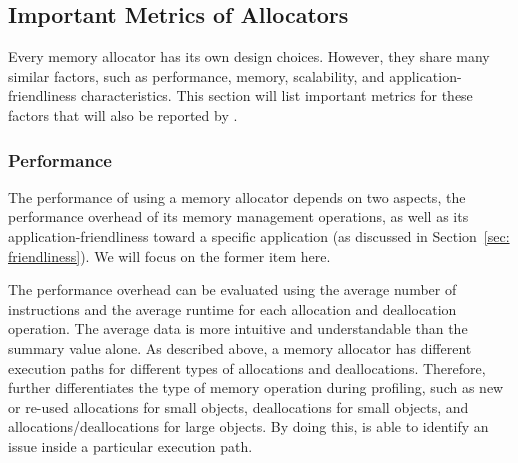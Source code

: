 

\subsection{Important Metrics of Allocators}

\label{sec:factors}

Every memory allocator has its own design choices. However, they share many similar factors, such as performance, memory, scalability, and application-friendliness characteristics. This section will list important metrics for these factors that will also be reported by \MP{}. 

\subsubsection{Performance}
\label{sec:performance}

The performance of using a memory allocator depends on two aspects, the performance overhead of its memory management operations, as well as its application-friendliness toward a specific application (as discussed in Section~\ref{sec: friendliness}). We will focus on the former item here. 

The performance overhead can be evaluated using the average number of instructions and the average runtime for each allocation and deallocation operation. The average data is more intuitive and understandable than the summary value alone. As described above, a memory allocator has different execution paths for different types of allocations and deallocations. Therefore, \MP{} further differentiates the type of memory operation during profiling, such as new or re-used allocations for small objects, deallocations for small objects, and allocations/deallocations for large objects. By doing this, \MP{} is able to identify an issue inside a particular execution path.

